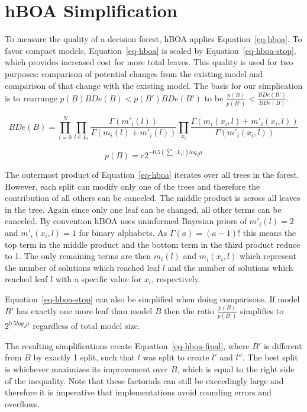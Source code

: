 \chapter{hBOA Simplification}
\label{chap-appendix-hboa}
To measure the quality of a decision forest, hBOA applies Equation~\ref{eq-hboa}.
To favor compact
models, Equation~\ref{eq-hboa} is scaled by Equation~\ref{eq-hboa-stop}, which provides increased cost
for more total leaves.
This quality is used for two purposes: comparison of potential changes from the existing model
and comparison of that change with the existing model. The basis for our simplication
is to rearrange $p(B)BDe(B) < p(B')BDe(B')$ to be $\frac{p(B)}{p(B')}<\frac{BDe(B')}{BDe(B)}$.

\begin{equation}
  BDe(B) = \prod_{i=0}^{N}\prod_{l\in L_i} \frac{\Gamma(m'_i(l))}{\Gamma(m_i(l) + m'_i(l))}
  \prod_{x_i}\frac{\Gamma(m_i(x_i, l) + m'_i(x_i,l))}{\Gamma(m'_i(x_i,l))}
  \label{eq-hboa}
\end{equation}

\begin{equation}
  p(B) = c2^{-0.5(\sum_i|L_i|)log_2\mu}
  \label{eq-hboa-stop}
\end{equation}

The outermost product of Equation~\ref{eq-hboa} iterates over all trees in the forest. However, each split
can modify only one of the trees and therefore the contribution of all others can be canceled. The middle
product is across all leaves in the tree. Again since only one leaf can be changed, all other terms can
be canceled. By convention hBOA uses uninformed Bayesian priors of $m'_i(l)= 2$ and $m'_i(x_i, l)=1$ for
binary alphabets. As $\Gamma(a) = (a-1)!$ this means the top term in the middle product and the bottom
term in the third product reduce to 1. The only remaining terms are then $m_i(l)$ and $m_i(x_i, l)$ which
represent the number of solutions which reached leaf $l$ and the number of solutions which reached leaf $l$
with a specific value for $x_i$, respectively.

Equation~\ref{eq-hboa-stop} can also be simplified when doing comparisons. If model $B'$ has exactly one more
leaf than model $B$ then the ratio $\frac{p(B)}{p(B')}$ simplifies to $2^{0.5 log_2\mu}$ regardless of
total model size.

The resulting simplifications create Equation~\ref{eq-hboa-final},
where $B'$ is different from $B$ by exactly 1 split, such that $l$ was split to create $l'$ and $l''$.
The best split is whichever maximizes its improvement over $B$, which is equal to the right side
of the inequality. Note that these factorials can still be exceedingly large and
therefore it is imperative that implementations avoid rounding errors and overflows.
